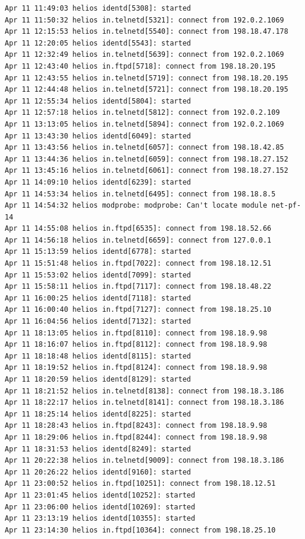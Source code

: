 \begin{lstlisting}[style=terminal]
Apr 11 11:49:03 helios identd[5308]: started
Apr 11 11:50:32 helios in.telnetd[5321]: connect from 192.0.2.1069
Apr 11 12:15:53 helios in.telnetd[5540]: connect from 198.18.47.178
Apr 11 12:20:05 helios identd[5543]: started
Apr 11 12:32:49 helios in.telnetd[5639]: connect from 192.0.2.1069
Apr 11 12:43:40 helios in.ftpd[5718]: connect from 198.18.20.195
Apr 11 12:43:55 helios in.telnetd[5719]: connect from 198.18.20.195
Apr 11 12:44:48 helios in.telnetd[5721]: connect from 198.18.20.195
Apr 11 12:55:34 helios identd[5804]: started
Apr 11 12:57:18 helios in.telnetd[5812]: connect from 192.0.2.109
Apr 11 13:13:05 helios in.telnetd[5894]: connect from 192.0.2.1069
Apr 11 13:43:30 helios identd[6049]: started
Apr 11 13:43:56 helios in.telnetd[6057]: connect from 198.18.42.85
Apr 11 13:44:36 helios in.telnetd[6059]: connect from 198.18.27.152
Apr 11 13:45:16 helios in.telnetd[6061]: connect from 198.18.27.152
Apr 11 14:09:10 helios identd[6239]: started
Apr 11 14:53:34 helios in.telnetd[6495]: connect from 198.18.8.5
Apr 11 14:54:32 helios modprobe: modprobe: Can't locate module net-pf-14
Apr 11 14:55:08 helios in.ftpd[6535]: connect from 198.18.52.66
Apr 11 14:56:18 helios in.telnetd[6659]: connect from 127.0.0.1
Apr 11 15:13:59 helios identd[6778]: started
Apr 11 15:51:48 helios in.ftpd[7022]: connect from 198.18.12.51
Apr 11 15:53:02 helios identd[7099]: started
Apr 11 15:58:11 helios in.ftpd[7117]: connect from 198.18.48.22
Apr 11 16:00:25 helios identd[7118]: started
Apr 11 16:00:40 helios in.ftpd[7127]: connect from 198.18.25.10
Apr 11 16:04:56 helios identd[7132]: started
Apr 11 18:13:05 helios in.ftpd[8110]: connect from 198.18.9.98
Apr 11 18:16:07 helios in.ftpd[8112]: connect from 198.18.9.98
Apr 11 18:18:48 helios identd[8115]: started
Apr 11 18:19:52 helios in.ftpd[8124]: connect from 198.18.9.98
Apr 11 18:20:59 helios identd[8129]: started
Apr 11 18:21:52 helios in.telnetd[8138]: connect from 198.18.3.186
Apr 11 18:22:17 helios in.telnetd[8141]: connect from 198.18.3.186
Apr 11 18:25:14 helios identd[8225]: started
Apr 11 18:28:43 helios in.ftpd[8243]: connect from 198.18.9.98
Apr 11 18:29:06 helios in.ftpd[8244]: connect from 198.18.9.98
Apr 11 18:31:53 helios identd[8249]: started
Apr 11 20:22:38 helios in.telnetd[9009]: connect from 198.18.3.186
Apr 11 20:26:22 helios identd[9160]: started
Apr 11 23:00:52 helios in.ftpd[10251]: connect from 198.18.12.51
Apr 11 23:01:45 helios identd[10252]: started
Apr 11 23:06:00 helios identd[10269]: started
Apr 11 23:13:19 helios identd[10355]: started
Apr 11 23:14:30 helios in.ftpd[10364]: connect from 198.18.25.10

\end{lstlisting}
